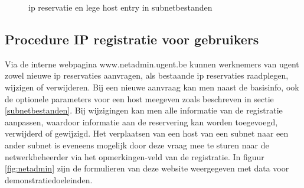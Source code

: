 \begin{figure}[H]
    \hspace*{\fill}
    \caption{\acrshort{ip} reservatie en lege host entry in subnetbestanden}
    \label{fig:host}
\end{figure}




\subsection{Procedure IP registratie voor gebruikers}
Via de interne webpagina www.netadmin.ugent.be kunnen werknemers van \acrshort{ugent} zowel nieuwe \acrshort{ip} reservaties aanvragen, als bestaande \acrshort{ip} reservaties raadplegen, wijzigen of verwijderen. Bij een nieuwe aanvraag kan men naast de basisinfo, ook de optionele parameters voor een host meegeven zoals beschreven in sectie \ref{subnetbestanden}. Bij wijzigingen kan men alle informatie van de registratie aanpassen, waardoor informatie aan de reservering kan worden toegevoegd, verwijderd of gewijzigd. Het verplaatsen van een host van een subnet naar een ander subnet is eveneens mogelijk door deze vraag mee te sturen naar de netwerkbeheerder via het opmerkingen-veld van de registratie. In figuur \ref{fig:netadmin} zijn de formulieren van deze website weergegeven met data voor demonstratiedoeleinden.

